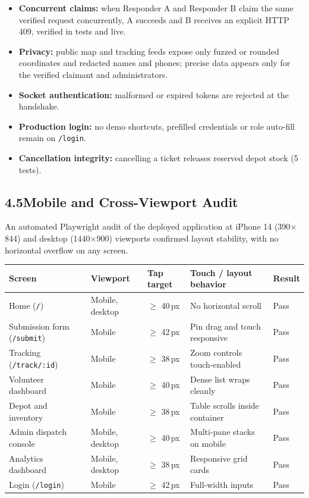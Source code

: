 \documentclass[11pt,a4paper]{article}
\newcommand{\tc}[1]{\texttt{\small #1}}
\begin{document}
\begin{itemize}
\item \textbf{Concurrent claims:} when Responder A and Responder B claim the same verified request concurrently, A succeeds and B receives an explicit HTTP 409, verified in tests and live.
\item \textbf{Privacy:} public map and tracking feeds expose only fuzzed or rounded coordinates and redacted names and phones; precise data appears only for the verified claimant and administrators.
\item \textbf{Socket authentication:} malformed or expired tokens are rejected at the handshake.
\item \textbf{Production login:} no demo shortcuts, prefilled credentials or role auto-fill remain on \tc{/login}.
\item \textbf{Cancellation integrity:} cancelling a ticket releases reserved depot stock (5 tests).
\end{itemize}

\subsection{4.5\quad Mobile and Cross-Viewport Audit}\label{s45}

An automated Playwright audit of the deployed application at iPhone 14 (390$\times$844) and desktop (1440$\times$900) viewports confirmed layout stability, with no horizontal overflow on any screen.

\renewcommand{\arraystretch}{1.15}
\begin{tabularx}{\textwidth}{@{}p{1.9in}p{1.0in}p{0.85in}Xp{0.45in}@{}}
\toprule
\textbf{Screen} & \textbf{Viewport} & \textbf{Tap target} & \textbf{Touch / layout behavior} & \textbf{Result}\\
\midrule
Home (\tc{/}) & Mobile, desktop & $\geq$ 40\,px & No horizontal scroll & Pass\\
Submission form (\tc{/submit}) & Mobile & $\geq$ 42\,px & Pin drag and touch responsive & Pass\\
Tracking (\tc{/track/:id}) & Mobile & $\geq$ 38\,px & Zoom controls touch-enabled & Pass\\
Volunteer dashboard & Mobile & $\geq$ 40\,px & Dense list wraps cleanly & Pass\\
Depot and inventory & Mobile & $\geq$ 38\,px & Table scrolls inside container & Pass\\
Admin dispatch console & Mobile, desktop & $\geq$ 40\,px & Multi-pane stacks on mobile & Pass\\
Analytics dashboard & Mobile, desktop & $\geq$ 38\,px & Responsive grid cards & Pass\\
Login (\tc{/login}) & Mobile & $\geq$ 42\,px & Full-width inputs & Pass\\
\bottomrule
\end{tabularx}
\renewcommand{\arraystretch}{1}
\end{document}
